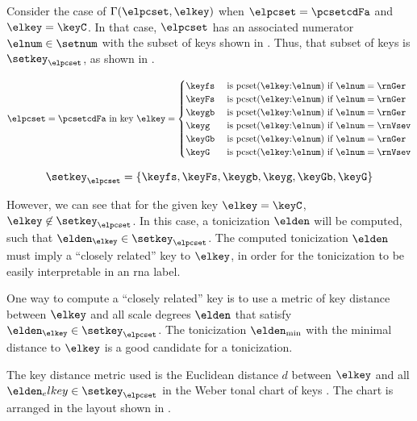 
Consider the case of $\Gamma(\elpcset, \elkey)$ when
$\elpcset = \pcsetcdFa$ and $\elkey = \keyC$. In that case,
$\elpcset$ has an associated numerator $\elnum \in \setnum$
with the subset of keys shown in .
Thus, that subset of keys is $\setkey_\elpcset$, as shown in
. 

\begin{equation}
    \label{eq:key_not_found}
    \elpcset = \pcsetcdFa \text{ in key } \elkey =
    \begin{cases}
        \keyfs & \text{ is pcset}(\elkey\text{:}\elnum)\text{ if } \elnum = \rnGer \\
        \keyFs & \text{ is pcset}(\elkey\text{:}\elnum)\text{ if } \elnum = \rnGer \\
        \keygb & \text{ is pcset}(\elkey\text{:}\elnum)\text{ if } \elnum = \rnGer \\
        \keyg  & \text{ is pcset}(\elkey\text{:}\elnum)\text{ if } \elnum = \rnVsev \\
        \keyGb & \text{ is pcset}(\elkey\text{:}\elnum)\text{ if } \elnum = \rnGer \\
        \keyG  & \text{ is pcset}(\elkey\text{:}\elnum)\text{ if } \elnum = \rnVsev \\
    \end{cases}
\end{equation}

\begin{equation}
    \label{eq:key_not_found2}
    \setkey_\elpcset = \{ \keyfs, \keyFs, \keygb, \keyg, \keyGb, \keyG \}
\end{equation}

However, we can see that for the given key $\elkey = \keyC$,
$\elkey \not\in \setkey_\elpcset$. In this case, a
tonicization $\elden$ will be computed, such that
$\elden_\elkey \in \setkey_\elpcset$. The computed
tonicization $\elden$ must imply a ``closely related'' key
to $\elkey$, in order for the tonicization to be easily
interpretable in an \gls{rna} label.

One way to compute a ``closely related'' key is to use a
metric of key distance between $\elkey$ and all scale
degrees $\elden$ that satisfy $\elden_\elkey \in
\setkey_\elpcset$. The tonicization $\elden_{\min}$ with the
minimal distance to $\elkey$ is a good candidate for a
tonicization.

The key distance metric used is the Euclidean distance $d$
between $\elkey$ and all $\elden_elkey \in \setkey_\elpcset$
in the Weber tonal chart of keys
\parencite{weber1818versuch}. The chart is arranged in the
layout shown in .

